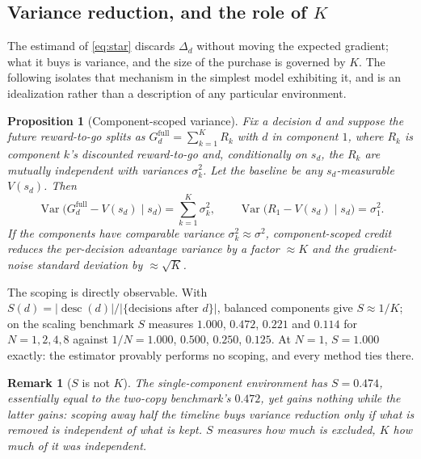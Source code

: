 \documentclass[review,authoryear,3p,times]{elsarticle}
\newtheorem{proposition}{Proposition}
\newtheorem{remark}{Remark}
\newcommand{\Var}{\operatorname{Var}}
\newcommand{\desc}{\operatorname{desc}}
\begin{document}
\subsection{Variance reduction, and the role of $K$}

The estimand of \eqref{eq:star} discards $\Delta_d$ without moving the expected
gradient; what it buys is variance, and the size of the purchase is governed by
$K$. The following isolates that mechanism in the simplest model exhibiting it,
and is an idealization rather than a description of any particular environment.

\begin{proposition}[Component-scoped variance]
\label{prop:k}
Fix a decision $d$ and suppose the future reward-to-go splits as
$G_d^{\mathrm{full}}=\sum_{k=1}^{K}R_k$ with $d$ in component $1$, where $R_k$ is
component $k$'s discounted reward-to-go and, conditionally on $s_d$, the $R_k$
are mutually independent with variances $\sigma_k^2$. Let the baseline be any
$s_d$-measurable $V(s_d)$. Then
\[
  \Var\bigl(G_d^{\mathrm{full}}-V(s_d)\mid s_d\bigr)=\sum_{k=1}^{K}\sigma_k^2,
  \qquad
  \Var\bigl(R_1-V(s_d)\mid s_d\bigr)=\sigma_1^2 .
\]
If the components have comparable variance $\sigma_k^2\approx\sigma^2$,
component-scoped credit reduces the per-decision advantage variance by a factor
$\approx K$ and the gradient-noise standard deviation by $\approx\sqrt{K}$.
\end{proposition}

The scoping is directly observable. With
$S(d)=|\desc(d)|/|\{\text{decisions after }d\}|$, balanced components give
$S\approx 1/K$; on the scaling benchmark $S$ measures $1.000$, $0.472$, $0.221$
and $0.114$ for $N=1,2,4,8$ against $1/N=1.000$, $0.500$, $0.250$, $0.125$. At
$N=1$, $S=1.000$ exactly: the estimator provably performs no scoping, and every
method ties there.

\begin{remark}[$S$ is not $K$]
The single-component environment has $S=0.474$, essentially equal to the
two-copy benchmark's $0.472$, yet gains nothing while the latter gains: scoping
away half the timeline buys variance reduction only if what is removed is
\emph{independent} of what is kept. $S$ measures how much is excluded, $K$ how
much of it was independent.
\end{remark}
\end{document}

